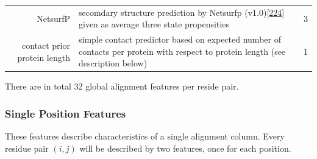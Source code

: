 \documentclass[11pt,a4paper,twoside]{book}
\theoremstyle{definition}
\theoremstyle{definition}
\theoremstyle{remark}
\begin{document}
\begin{longtable}[]{@{}rlc@{}}
\begin{minipage}[t]{0.23\columnwidth}\raggedleft\strut
NetsurfP\strut
\end{minipage} & \begin{minipage}[t]{0.50\columnwidth}\raggedright\strut
secomdary structure prediction by Netsurfp
(v1.0){[}\protect\hyperlink{ref-Petersen2009a}{224}{]} given as average
three state propensities\strut
\end{minipage} & \begin{minipage}[t]{0.18\columnwidth}\centering\strut
3\strut
\end{minipage}\tabularnewline
\begin{minipage}[t]{0.23\columnwidth}\raggedleft\strut
contact prior protein length\strut
\end{minipage} & \begin{minipage}[t]{0.50\columnwidth}\raggedright\strut
simple contact predictor based on expected number of contacts per
protein with respect to protein length (see description below)\strut
\end{minipage} & \begin{minipage}[t]{0.18\columnwidth}\centering\strut
1\strut
\end{minipage}\tabularnewline
\bottomrule
\end{longtable}

There are in total 32 global alignment features per reside pair.

\subsubsection{Single Position Features}\label{seq-features-single}

These features describe characteristics of a single alignment column.
Every residue pair \((i,j)\) will be described by two features, once for
each position.
\end{document}
